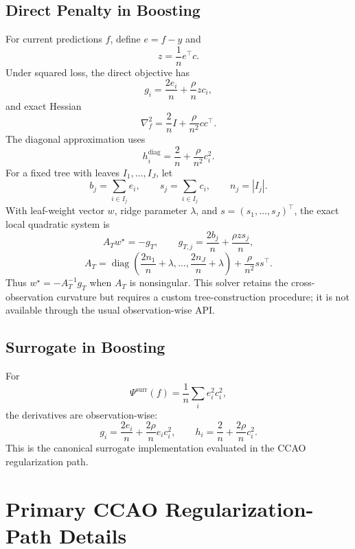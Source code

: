 \documentclass[10pt]{article}
\theoremstyle{definition}
\newcommand{\diag}{\operatorname{diag}}
\newcommand{\1}{\mathbf{1}}
\newcommand{\oldtext}[1]{\textcolor{blue}{\sout{#1}}}
\newcommand{\newtext}[1]{\textcolor{impGreen}{#1}}
\begin{document}

\subsection{Direct Penalty in Boosting}

For current predictions $f$, define $e=f-y$ and
\[
z=\frac{1}{n}e^\top c.
\]
Under squared loss, the direct objective has
\[
g_i=\frac{2e_i}{n}+\frac{\rho}{n}zc_i,
\]
and exact Hessian
\[
\nabla_f^2
=
\frac{2}{n}I+\frac{\rho}{n^2}cc^\top.
\]
The diagonal approximation uses
\[
h_i^{\mathrm{diag}}
=
\frac{2}{n}+\frac{\rho}{n^2}c_i^2.
\]
For a fixed tree with leaves $I_1,\ldots,I_J$, let
\[
b_j=\sum_{i\in I_j}e_i,
\qquad
s_j=\sum_{i\in I_j}c_i,
\qquad
n_j=|I_j|.
\]
With leaf-weight vector $w$, ridge parameter $\lambda$, and $s=(s_1,\ldots,s_J)^\top$, the exact local quadratic system is
\[
A_Tw^\star=-g_T,
\qquad
g_{T,j}=\frac{2b_j}{n}+\frac{\rho z s_j}{n},
\]
\[
A_T
=
\diag\!\left(\frac{2n_1}{n}+\lambda,\ldots,\frac{2n_J}{n}+\lambda\right)
+\frac{\rho}{n^2}ss^\top.
\]
Thus $w^\star=-A_T^{-1}g_T$ when $A_T$ is nonsingular. This solver retains the cross-observation curvature but requires a custom tree-construction procedure; it is not available through the usual observation-wise API.

\subsection{Surrogate in Boosting}

For
\[
\Psi^{\mathrm{surr}}(f)
=
\frac{1}{n}\sum_i e_i^2c_i^2,
\]
the derivatives are observation-wise:
\[
g_i=\frac{2e_i}{n}+\frac{2\rho}{n}e_ic_i^2,
\qquad
h_i=\frac{2}{n}+\frac{2\rho}{n}c_i^2.
\]
This is the canonical surrogate implementation evaluated in the CCAO regularization path.


\section{\texorpdfstring{
\newtext{Primary CCAO Regularization-Path Details}}{Primary CCAO Regularization-Path Details}}
\label{app:ccao_path_details}
\end{document}
